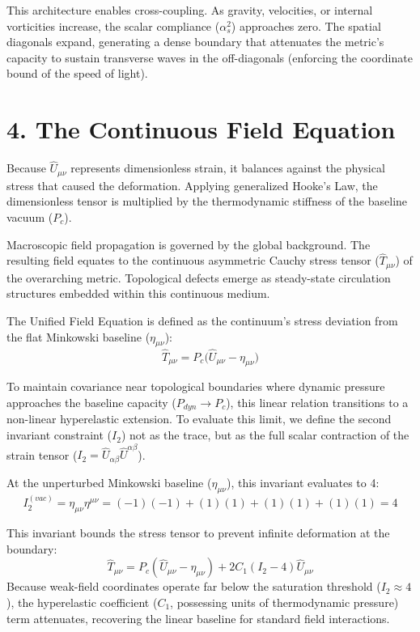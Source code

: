 This architecture enables cross-coupling. As gravity, velocities, or internal vorticities increase, the scalar compliance ($\alpha_s^2$) approaches zero. The spatial diagonals expand, generating a dense boundary that attenuates the metric's capacity to sustain transverse waves in the off-diagonals (enforcing the coordinate bound of the speed of light). %
\vspace{0.3cm}


\section*{4. The Continuous Field Equation}
Because $\hat{U}_{\mu\nu}$ represents dimensionless strain, it balances against the physical stress that caused the deformation. Applying generalized Hooke's Law, the dimensionless tensor is multiplied by the thermodynamic stiffness of the baseline vacuum ($P_c$).

Macroscopic field propagation is governed by the global background. The resulting field equates to the continuous asymmetric Cauchy stress tensor ($\hat{T}_{\mu\nu}$) of the overarching metric. Topological defects emerge as steady-state circulation structures embedded within this continuous medium. 

The Unified Field Equation is defined as the continuum's stress deviation from the flat Minkowski baseline ($\eta_{\mu\nu}$):
\begin{equation}
    \hat{T}_{\mu\nu} = P_c \Big( \hat{U}_{\mu\nu} - \eta_{\mu\nu} \Big) \label{eq:field_equation}
\end{equation}

To maintain covariance near topological boundaries where dynamic pressure approaches the baseline capacity ($P_{dyn} \to P_c$), this linear relation transitions to a non-linear hyperelastic extension. To evaluate this limit, we define the second invariant constraint ($I_2$) not as the trace, but as the full scalar contraction of the strain tensor ($I_2 = \hat{U}_{\alpha\beta}\hat{U}^{\alpha\beta}$).

At the unperturbed Minkowski baseline ($\eta_{\mu\nu}$), this invariant evaluates to 4: 
\begin{equation} 
    I_2^{(vac)} = \eta_{\mu\nu}\eta^{\mu\nu} = (-1)(-1) + (1)(1) + (1)(1) + (1)(1) = 4 
\end{equation} 

This invariant bounds the stress tensor to prevent infinite deformation at the boundary:
\begin{equation}
    \hat{T}_{\mu\nu} = P_c \left( \hat{U}_{\mu\nu} - \eta_{\mu\nu} \right) + 2C_1 \left( I_2 - 4 \right) \hat{U}_{\mu\nu} \label{eq:hyperelastic_tensor} 
\end{equation}
Because weak-field coordinates operate far below the saturation threshold ($I_2 \approx 4$), the hyperelastic coefficient ($C_1$, possessing units of thermodynamic pressure) term attenuates, recovering the linear baseline for standard field interactions. 

